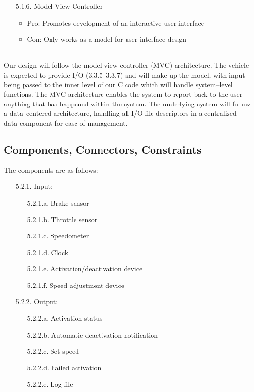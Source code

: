 \documentclass{article}
\begin{document}
\begin{enumerate}
		\item[5.1.6.] Model View Controller
		\begin{itemize}
			\item Pro: Promotes development of an interactive user interface
			\item Con: Only works as a model for user interface design
		\end{itemize}	
	\end{enumerate}
	
	\ \\ \indent Our design will follow the model view controller (MVC) architecture. The vehicle is expected to provide I/O (3.3.5--3.3.7) and will make up the model, with input being passed to the inner level of our C code which will handle system--level functions. The MVC architecture enables the system to report back to the user anything that has happened within the system. The underlying system will follow a data--centered architecture, handling all I/O file descriptors in a centralized data component for ease of management.
	
	\subsection{Components, Connectors, Constraints}
	\indent\indent The components are as follows:
	\begin{enumerate}
		\item[5.2.1.] Input:
		\begin{enumerate}
			\item[5.2.1.a.] Brake sensor
			\item[5.2.1.b.] Throttle sensor
			\item[5.2.1.c.] Speedometer
			\item[5.2.1.d.] Clock
			\item[5.2.1.e.] Activation/deactivation device
			\item[5.2.1.f.] Speed adjustment device
		\end{enumerate}
		\item[5.2.2.] Output:
		\begin{enumerate}
			\item[5.2.2.a.] Activation status
			\item[5.2.2.b.] Automatic deactivation notification
			\item[5.2.2.c.] Set speed
			\item[5.2.2.d.] Failed activation
			\item[5.2.2.e.] Log file
		\end{enumerate}
	\end{enumerate}
	
\end{document}
